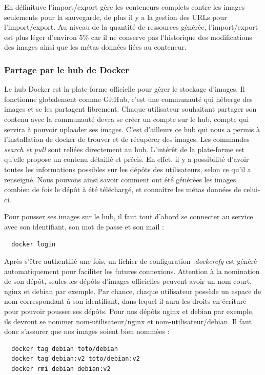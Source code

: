 \documentclass[12pt,a4paper]{article}
\begin{document}
En définituve l'import/export gère les conteneurs complets contre les images seulements pour la sauvegarde, de plus il y a la gestion des URLs pour l'import/export. Au niveau de la quantité de ressources générée, l'import/export est plus léger d'environ 5\% car il ne conserve pas l'historique des modifications des images ainsi que les métas données liées au conteneur.

\subsubsection{Partage par le hub de Docker}

Le hub Docker est la plate-forme officielle pour gérer le stockage d'images. Il fonctionne globalement comme GitHub, c'est une communauté qui héberge des images et se les partagent librement. Chaque utilisateur souhaitant partager son contenu avec la communauté devra se créer un compte sur le hub, compte qui servira à pouvoir uploader ses images. C'est d'ailleurs ce hub qui nous a permis à l'installation de docker de trouver et de récupérer des images. Les commandes \textit{search et pull} sont reliées directement au hub. L'intérêt de la plate-forme est qu'elle propose un contenu détaillé et précis. En effet, il y a possibilité d'avoir toutes les informations possibles sur les dépôts des utilisateurs, selon ce qu'il a renseigné. Nous pouvons ainsi savoir comment ont été générées les images, combien de fois le dépôt à été téléchargé, et connaître les métas données de celui-ci.

Pour pousser ses images sur le hub, il faut tout d'abord se connecter au service avec son identifiant, son mot de passe et son mail :
\begin{lstlisting}
  docker login
\end{lstlisting}
Après s'être authentifié une fois, un fichier de configuration \textit{.dockercfg} est généré automatiquement pour faciliter les futures connexions. Attention à la nomination de son dépôt, seules les dépôts d'images officielles peuvent avoir un nom court, nginx et debian par exemple. Par chance, chaque utilisateur possède un espace de nom correspondant à son identifiant, dans lequel il aura les droits en écriture pour pouvoir pousser ses dépôts. Pour nos dépôts nginx et debian par exemple, ils devront se nommer nom-utilisateur/nginx et nom-utilisateur/debian. Il faut donc s'assurer que nos images soient bien nommées :

\begin{lstlisting}
  docker tag debian toto/debian
  docker tag debian:v2 toto/debian:v2
  docker rmi debian debian:v2
\end{lstlisting}
\end{document}
